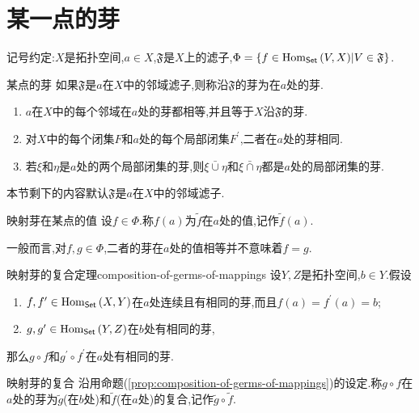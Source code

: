 \section{某一点的芽}

记号约定:$X$是拓扑空间,$a\in X$,$\mathfrak{F}$是$X$上的滤子,$\Phi=\left\{f\in\operatorname{Hom}_{\mathsf{Set}}\left(V,X\right)\middle|V\in\mathfrak{F}\right\}$.

\begin{definition}{某点的芽}{}
	如果$\mathfrak{F}$是$a$在$X$中的邻域滤子,则称沿$\mathfrak{F}$的芽为在$a$处的芽.
\end{definition}

\begin{remark}{}{}
	\begin{enumerate}
		\item $a$在$X$中的每个邻域在$a$处的芽都相等,并且等于$X$沿$\mathfrak{F}$的芽.
		\item 对$X$中的每个闭集$F$和$a$处的每个局部闭集$F^{\prime}$,二者在$a$处的芽相同.
		\item 若$\xi$和$\eta$是$a$处的两个局部闭集的芽,则$\xi\bar{\cup}\eta$和$\xi\bar{\cap}\eta$都是$a$处的局部闭集的芽.
	\end{enumerate}
\end{remark}

本节剩下的内容默认$\mathfrak{F}$是$a$在$X$中的邻域滤子.

\begin{definition}{映射芽在某点的值}{}
	设$f\in\Phi$.称$f\left(a\right)$为$\tilde{f}$在$a$处的值,记作$\tilde{f}\left(a\right)$.
\end{definition}

\begin{remark}{}{}
	一般而言,对$f,g\in\Phi$,二者的芽在$a$处的值相等并不意味着$f=g$.
\end{remark}

\begin{proposition}{映射芽的复合定理}{composition-of-germs-of-mappings}
	设$Y,Z$是拓扑空间,$b\in Y$.假设
	\begin{enumerate}
		\item $f,f^{\prime}\in\operatorname{Hom}_{\mathsf{Set}}\left(X,Y\right)$在$a$处连续且有相同的芽,而且$f\left(a\right)=f^{\prime}\left(a\right)=b$;
		\item $g,g^{\prime}\in\operatorname{Hom}_{\mathsf{Set}}\left(Y,Z\right)$在$b$处有相同的芽,
	\end{enumerate}
	那么$g\circ f$和$g^{\prime}\circ f^{\prime}$在$a$处有相同的芽.
\end{proposition}

\begin{definition}{映射芽的复合}{}
	沿用命题(\ref{prop:composition-of-germs-of-mappings})的设定.称$g\circ f$在$a$处的芽为$\tilde{g}$(在$b$处)和$\tilde{f}$(在$a$处)的复合,记作$\tilde{g}\circ\tilde{f}$.
\end{definition}